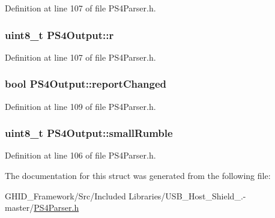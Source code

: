 \-Definition at line 107 of file \-P\-S4\-Parser.\-h.

\hypertarget{struct_p_s4_output_a76a85e749899e2e6cb135a6ec6acabb3}{
\subsubsection[{r}]{\setlength{\rightskip}{0pt plus 5cm}uint8\-\_\-t {\bf \-P\-S4\-Output\-::r}}}\label{struct_p_s4_output_a76a85e749899e2e6cb135a6ec6acabb3}


\-Definition at line 107 of file \-P\-S4\-Parser.\-h.

\hypertarget{struct_p_s4_output_aff395d1c46c9016ab4ea8ddbf034788b}{
\subsubsection[{report\-Changed}]{\setlength{\rightskip}{0pt plus 5cm}bool {\bf \-P\-S4\-Output\-::report\-Changed}}}\label{struct_p_s4_output_aff395d1c46c9016ab4ea8ddbf034788b}


\-Definition at line 109 of file \-P\-S4\-Parser.\-h.

\hypertarget{struct_p_s4_output_a8c6030198733f66a5cb96b8a49e07618}{
\subsubsection[{small\-Rumble}]{\setlength{\rightskip}{0pt plus 5cm}uint8\-\_\-t {\bf \-P\-S4\-Output\-::small\-Rumble}}}\label{struct_p_s4_output_a8c6030198733f66a5cb96b8a49e07618}


\-Definition at line 106 of file \-P\-S4\-Parser.\-h.



\-The documentation for this struct was generated from the following file\-:\begin{DoxyCompactItemize}
\item 
\-G\-H\-I\-D\-\_\-\-Framework/\-Src/\-Included Libraries/\-U\-S\-B\-\_\-\-Host\-\_\-\-Shield\-\_.-\/master/\hyperlink{_p_s4_parser_8h}{\-P\-S4\-Parser.\-h}\end{DoxyCompactItemize}
